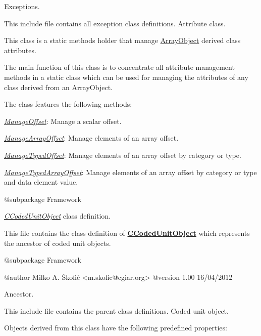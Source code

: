 Exceptions.

This include file contains all exception class definitions. Attribute class.

This class is a static methods holder that manage \hyperlink{}{Array\-Object} derived class attributes.

The main function of this class is to concentrate all attribute management methods in a static class which can be used for managing the attributes of any class derived from an Array\-Object.

The class features the following methods\-:


\begin{DoxyItemize}
\item {\itshape \hyperlink{}{Manage\-Offset}}\-: Manage a scalar offset. 
\item {\itshape \hyperlink{}{Manage\-Array\-Offset}}\-: Manage elements of an array offset. 
\item {\itshape \hyperlink{}{Manage\-Typed\-Offset}}\-: Manage elements of an array offset by category or type. 
\item {\itshape \hyperlink{}{Manage\-Typed\-Array\-Offset}}\-: Manage elements of an array offset by category or type and data element value. 
\end{DoxyItemize}

\begin{DoxyVerb}    @subpackage     Framework\end{DoxyVerb}


{\itshape \hyperlink{class_c_coded_unit_object}{C\-Coded\-Unit\-Object}} class definition.

This file contains the class definition of {\bfseries \hyperlink{class_c_coded_unit_object}{C\-Coded\-Unit\-Object}} which represents the ancestor of coded unit objects.

\begin{DoxyVerb}    @subpackage     Framework

    @author         Milko A. Škofič <m.skofic@cgiar.org>
    @version        1.00 16/04/2012\end{DoxyVerb}


Ancestor.

This include file contains the parent class definitions. Coded unit object.

Objects derived from this class have the following predefined properties\-:


